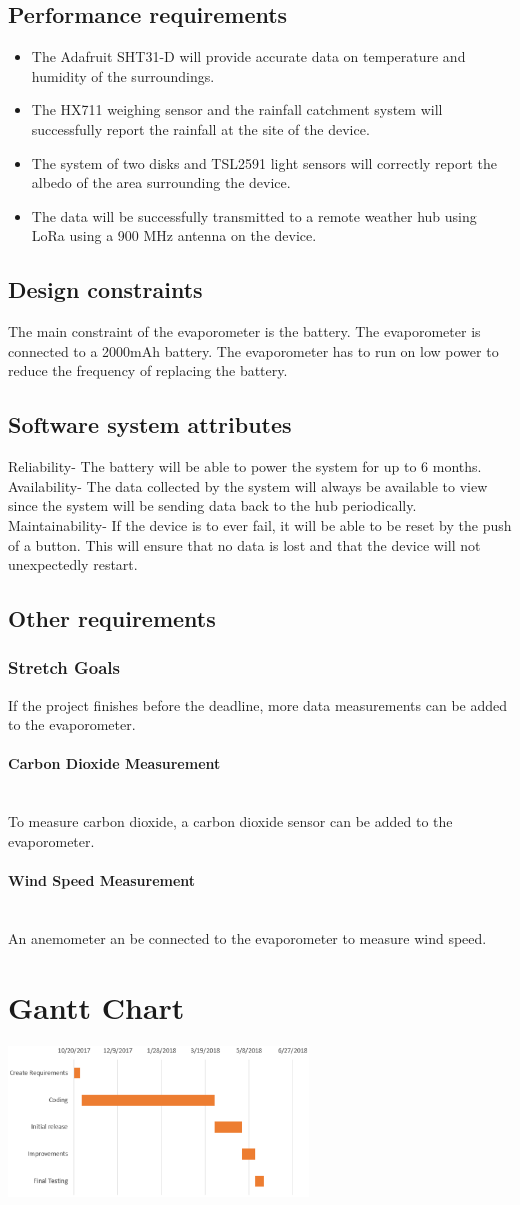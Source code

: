\documentclass[onecolumn, draftclsnofoot,10pt, compsoc]{IEEEtran}
\newcommand{\subsubsubsection}[1]{\paragraph{#1}\mbox{}\\}
\begin{document}
\subsection{Performance requirements}
\begin{itemize}

\item The Adafruit SHT31-D will provide accurate data on temperature and humidity of the surroundings.
\item The HX711 weighing sensor and the rainfall catchment system will successfully report the rainfall at the site of the device.
\item The system of two disks and TSL2591 light sensors will correctly report the albedo of the area surrounding the device.
\item The data will be successfully transmitted to a remote weather hub using LoRa using a 900 MHz antenna on the device.
\end{itemize}
\subsection{Design constraints}
The main constraint of the evaporometer is the battery. The evaporometer is connected to a 2000mAh battery. The evaporometer has to run on low power to reduce the frequency of replacing the battery.
\subsection{Software system attributes}
Reliability- The battery will be able to power the system for up to 6 months.
Availability- The data collected by the system will always be available to view since the system will be sending data back to the hub periodically.
Maintainability- If the device is to ever fail, it will be able to be reset by the push of a button. This will ensure that no data is lost and that the device will not unexpectedly restart.
\subsection{Other requirements}
\subsubsection{Stretch Goals}
If the project finishes before the deadline, more data measurements can be added to the evaporometer.
\subsubsubsection{Carbon Dioxide Measurement}
To measure carbon dioxide, a carbon dioxide sensor can be added to the evaporometer.
\subsubsubsection{Wind Speed Measurement}
An anemometer an be connected to the evaporometer to measure wind speed.

\section{Gantt Chart}
\includegraphics[height=4cm]{gantt.eps}
\end{document}
